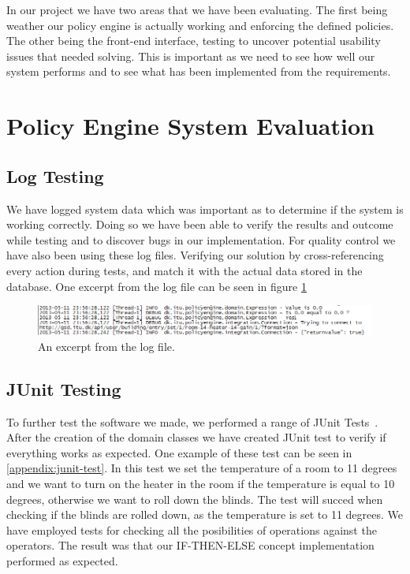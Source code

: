 In our project we have two areas that we have been evaluating. The first being weather our policy engine is actually working and enforcing the defined policies. The other being the front-end interface, testing to uncover potential usability issues that needed solving.
This is important as we need to see how well our system performs and to see what has been implemented from the requirements.
\section{Policy Engine System Evaluation}
\label{policy-engine-system-evaluation}

\subsection{Log Testing}
\label{log-test}
We have logged system data which was important as to determine if the system is working correctly. Doing so we have been able to verify the results and outcome while testing and to discover bugs in our implementation.
For quality control we have also been using these log files. Verifying our solution by cross-referencing every action during tests, and match it with the actual data stored in the database.
One excerpt from the log file can be seen in figure \ref{fig:log}

\begin{figure}[ht]
\centering
\includegraphics[width=\columnwidth]{images/logoutput.png}
\caption{An excerpt from the log file.}
\label{fig:log}
\end{figure}

\subsection{JUnit Testing}
To further test the software we made, we performed a range of JUnit Tests~\cite{junit}. After the creation of the domain classes we have created JUnit test to verify if everything works as expected. 
One example of these test can be seen in \ref{appendix:junit-test}. In this test we set the temperature of a room to 11 degrees and we want to turn on the heater in the room if the temperature is equal to 10 degrees, otherwise we want to roll down the blinds. The test will succed when checking if the blinds are rolled down, as the temperature is set to 11 degrees. 
We have employed tests for checking all the posibilities of operations against the operators. 
The result was that our IF-THEN-ELSE concept implementation performed as expected. 

